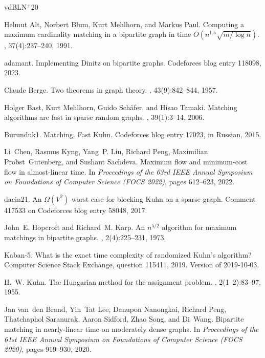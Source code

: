 \documentclass[10pt]{article}
\begin{document}
\newcommand{\etalchar}[1]{$^{#1}$}
\begin{thebibliography}{vdBLN{\etalchar{+}}20}

Helmut Alt, Norbert Blum, Kurt Mehlhorn, and Markus Paul.
\newblock Computing a maximum cardinality matching in a bipartite graph in time
  {$O(n^{1.5}\sqrt{m/\log n})$}.
, 37(4):237--240, 1991.

{adamant}.
\newblock Implementing {D}initz on bipartite graphs.
\newblock Codeforces blog entry 118098, 2023.

Claude Berge.
\newblock Two theorems in graph theory.
,
  43(9):842--844, 1957.

Holger Bast, Kurt Mehlhorn, Guido Sch\"{a}fer, and Hisao Tamaki.
\newblock Matching algorithms are fast in sparse random graphs.
, 39(1):3--14, 2006.

{Burunduk1}.
\newblock Matching. {F}ast {K}uhn.
\newblock Codeforces blog entry 17023, in Russian, 2015.

\bibitem[CKL{\etalchar{+}}22]{CKLPGS22}
Li~Chen, Rasmus Kyng, Yang~P. Liu, Richard Peng, Maximilian Probst~Gutenberg,
  and Sushant Sachdeva.
\newblock Maximum flow and minimum-cost flow in almost-linear time.
\newblock In {\em Proceedings of the 63rd IEEE Annual Symposium on Foundations
  of Computer Science (FOCS 2022)}, pages 612--623, 2022.

{dacin21}.
\newblock An {$\Omega(V^2)$} worst case for blocking {K}uhn on a sparse graph.
\newblock Comment 417533 on Codeforces blog entry 58048, 2017.

John~E. Hopcroft and Richard~M. Karp.
\newblock An {$n^{5/2}$} algorithm for maximum matchings in bipartite graphs.
, 2(4):225--231, 1973.

{Kaban-5}.
\newblock What is the exact time complexity of randomized {K}uhn's algorithm?
\newblock Computer Science Stack Exchange, question 115411, 2019.
\newblock Version of 2019-10-03.

H.~W. Kuhn.
\newblock The {H}ungarian method for the assignment problem.
, 2(1--2):83--97, 1955.

\bibitem[vdBLN{\etalchar{+}}20]{BLNPSSSW20}
Jan van~den Brand, Yin~Tat Lee, Danupon Nanongkai, Richard Peng, Thatchaphol
  Saranurak, Aaron Sidford, Zhao Song, and Di~Wang.
\newblock Bipartite matching in nearly-linear time on moderately dense graphs.
\newblock In {\em Proceedings of the 61st IEEE Annual Symposium on Foundations
  of Computer Science (FOCS 2020)}, pages 919--930, 2020.

\end{thebibliography}
\end{document}
